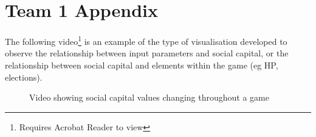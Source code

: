 \chapter{Team 1 Appendix}

The following video\footnote{Requires Acrobat Reader to view} is an example of the type of visualisation developed to observe the relationship between input parameters and social capital, or the relationship between social capital and elements within the game (eg HP, elections).

\begin{figure}[!h]
\begin{frame}{}
  \centering

\end{frame}
\caption{Video showing social capital values changing throughout a game}
  \label{ani:sc_visual_vid}
\end{figure}